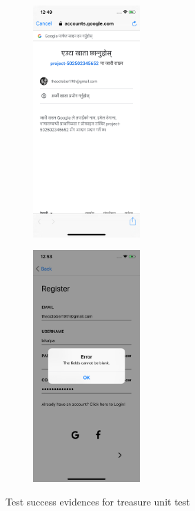 \documentclass[12pt, a4paper, oneside]{article}
\begin{document}
\begin{figure}[H]
\begin{subfigure}{.5\textwidth}
    \centering
    \includegraphics[width=0.45\textwidth]{test-evidences/auth/e.png}
    \caption{}
\end{subfigure}%
\begin{subfigure}{.5\textwidth}
    \centering
    \includegraphics[width=0.45\textwidth]{test-evidences/auth/f.png}
    \caption{}
\end{subfigure}


\caption{Test success evidences for treasure unit test}
\label{fig:test-evidence-treasure}
\end{figure}
\end{document}
